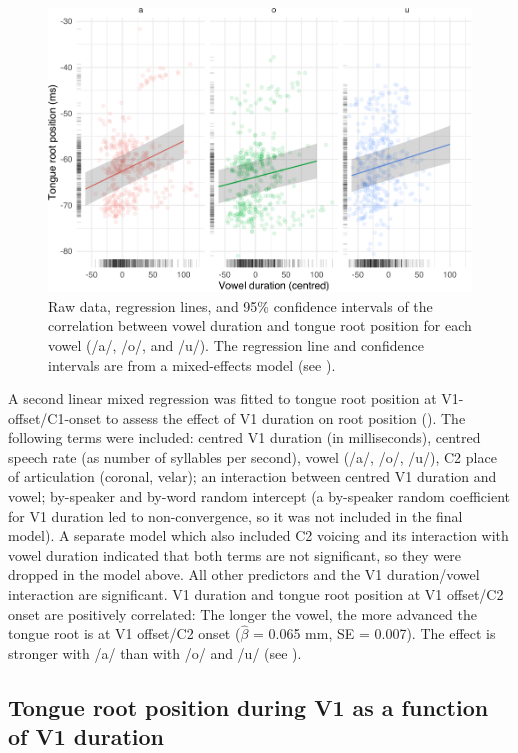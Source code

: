 \documentclass[preprint]{JASAnew}
\begin{document}
\label{s:trp-vdur}

\begin{figure}
\includegraphics[width=\linewidth]{./Figure5-1} \caption{Raw data, regression lines, and 95\% confidence intervals of the correlation between vowel duration and tongue root position for each vowel (/a/, /o/, and /u/). The regression line and confidence intervals are from a mixed-effects model (see ).}\label{f:Figure5}
\end{figure}

A second linear mixed regression was fitted to tongue root position at
V1-offset/C1-onset to assess the effect of V1 duration on root position
(). The following terms were included: centred
V1 duration (in milliseconds), centred speech rate (as number of
syllables per second), vowel (/a/, /o/, /u/), C2 place of articulation
(coronal, velar); an interaction between centred V1 duration and vowel;
by-speaker and by-word random intercept (a by-speaker random coefficient
for V1 duration led to non-convergence, so it was not included in the
final model). A separate model which also included C2 voicing and its
interaction with vowel duration indicated that both terms are not
significant, so they were dropped in the model above. All other
predictors and the V1 duration/vowel interaction are significant. V1
duration and tongue root position at V1 offset/C2 onset are positively
correlated: The longer the vowel, the more advanced the tongue root is
at V1 offset/C2 onset (\(\hat{\beta}\) = 0.065 mm, SE = 0.007). The
effect is stronger with /a/ than with /o/ and /u/ (see
).

\hypertarget{tongue-root-position-during-v1-as-a-function-of-v1-duration}{%
\subsection{Tongue root position during V1 as a function of V1
duration}\label{tongue-root-position-during-v1-as-a-function-of-v1-duration}}
\end{document}
